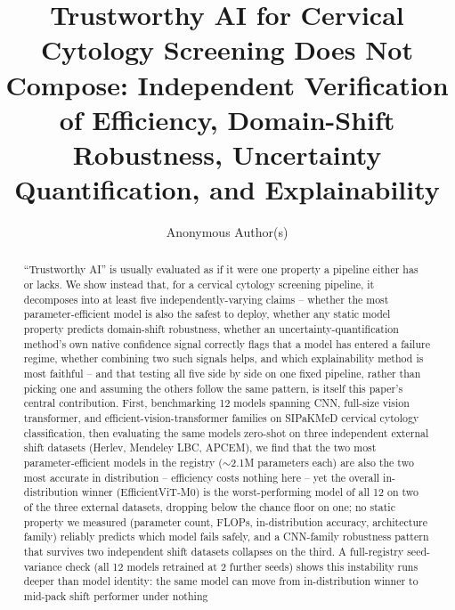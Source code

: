 \documentclass[runningheads]{llncs}
\begin{document}
\title{Trustworthy AI for Cervical Cytology Screening Does Not Compose: Independent Verification of Efficiency, Domain-Shift Robustness, Uncertainty Quantification, and Explainability}

\author{Anonymous Author(s)}

\maketitle

\begin{abstract}
``Trustworthy AI'' is usually evaluated as if it were one property a
pipeline either has or lacks. We show instead that, for a cervical
cytology screening pipeline, it decomposes into at least five
independently-varying claims -- whether the most parameter-efficient
model is also the safest to deploy, whether any static model property
predicts domain-shift robustness, whether an uncertainty-quantification
method's own native confidence signal correctly flags that a model has
entered a failure regime, whether combining two such signals helps, and
which explainability method is most faithful -- and that testing all five
side by side on one fixed pipeline, rather than picking one and assuming
the others follow the same pattern, is itself this paper's central
contribution. First, benchmarking 12 models spanning CNN, full-size vision
transformer, and efficient-vision-transformer families on SIPaKMeD
cervical cytology classification, then evaluating the same models
zero-shot on three independent external shift datasets (Herlev, Mendeley
LBC, APCEM), we find that the two most parameter-efficient models in the
registry ($\sim$2.1M parameters each) are also the two most accurate in
distribution -- efficiency costs nothing here -- yet the overall
in-distribution winner (EfficientViT-M0) is the worst-performing model of
all 12 on two of the three external datasets, dropping below the chance
floor on one; no static property we measured (parameter count, FLOPs,
in-distribution accuracy, architecture family) reliably predicts which
model fails safely, and a CNN-family robustness pattern that survives two
independent shift datasets collapses on the third. A full-registry
seed-variance check (all 12 models retrained at 2 further seeds) shows
this instability runs deeper than model identity: the same model can move
from in-distribution winner to mid-pack shift performer under nothing

\end{abstract}
\end{document}

